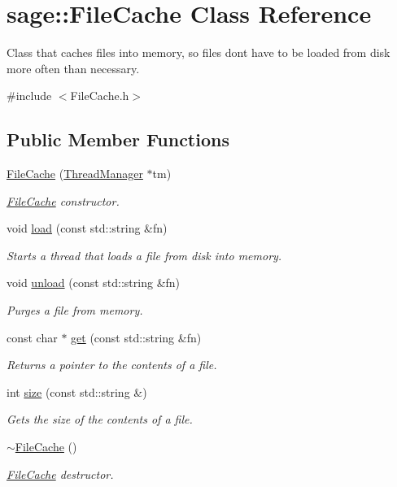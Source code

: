 \hypertarget{classsage_1_1FileCache}{}\section{sage\+::File\+Cache Class Reference}
\label{classsage_1_1FileCache}


Class that caches files into memory, so files don\textquotesingle{}t have to be loaded from disk more often than necessary.  




{\ttfamily \#include $<$File\+Cache.\+h$>$}

\subsection*{Public Member Functions}
\begin{DoxyCompactItemize}
\item 
\mbox{\hyperlink{classsage_1_1FileCache_af7d6799763e910957cee829000f9adb6}{File\+Cache}} (\mbox{\hyperlink{classsage_1_1ThreadManager}{Thread\+Manager}} $\ast$tm)
\begin{DoxyCompactList}\small\item\em \mbox{\hyperlink{classsage_1_1FileCache}{File\+Cache}} constructor. \end{DoxyCompactList}\item 
void \mbox{\hyperlink{classsage_1_1FileCache_addb15593e848f038a5d7a7c6c3828053}{load}} (const std\+::string \&fn)
\begin{DoxyCompactList}\small\item\em Starts a thread that loads a file from disk into memory. \end{DoxyCompactList}\item 
void \mbox{\hyperlink{classsage_1_1FileCache_a902a36451f11c4b6e4267358bfadb024}{unload}} (const std\+::string \&fn)
\begin{DoxyCompactList}\small\item\em Purges a file from memory. \end{DoxyCompactList}\item 
const char $\ast$ \mbox{\hyperlink{classsage_1_1FileCache_a67fe1af6ccb8d06b7e97dc54a1836eee}{get}} (const std\+::string \&fn)
\begin{DoxyCompactList}\small\item\em Returns a pointer to the contents of a file. \end{DoxyCompactList}\item 
int \mbox{\hyperlink{classsage_1_1FileCache_a369b86f1fb585e5ce5142a7f1f22e38c}{size}} (const std\+::string \&)
\begin{DoxyCompactList}\small\item\em Gets the size of the contents of a file. \end{DoxyCompactList}\item 
\mbox{\hyperlink{classsage_1_1FileCache_a07c4e05a6d3d792685b48fba44142e08}{$\sim$\+File\+Cache}} ()
\begin{DoxyCompactList}\small\item\em \mbox{\hyperlink{classsage_1_1FileCache}{File\+Cache}} destructor. \end{DoxyCompactList}\end{DoxyCompactItemize}
